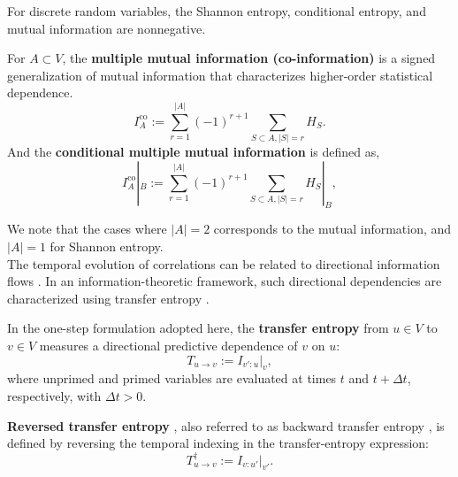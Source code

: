 \documentclass{comnet}%
\begin{document}
For discrete random variables, the Shannon entropy, conditional entropy, and mutual information are nonnegative.\\

\begin{definition}
	For $A \subset V$, the \textbf{multiple mutual information (co-information)} \cite{McGill1954, Fano1949, Han1980} is a signed generalization of mutual information that characterizes higher-order statistical dependence.
	\begin{equation}
		I^{\text{co}}_{A} := \sum_{r = 1}^{|A|} (-1)^{r+1} \sum_{S \subset A, |S|=r}H_{S}.
	\end{equation}
	And the \textbf{conditional multiple mutual information} is defined as,
	\begin{equation}
		I^{\text{co}}_{A}|_{B} := \sum_{r = 1}^{|A|} (-1)^{r+1} \sum_{S \subset A, |S|=r}H_{S}|_{B},
	\end{equation}
\end{definition}
We note that the cases where $|A| = 2$ corresponds to the mutual information, and $|A| = 1$ for Shannon entropy. \\

The temporal evolution of correlations can be related to directional information flows \cite{Lee2026a}. In an information-theoretic framework, such directional dependencies are characterized using transfer entropy \cite{Barnett2009}.

\begin{definition}
	In the one-step formulation adopted here, the \textbf{transfer entropy} \cite{Schreiber2000, Bossomaier2016} from $u \in V$ to $v \in V$ measures a directional predictive dependence of $v$ on $u$: \\
	\begin{equation}
		T_{u \to v} := I_{v':u}|_{v},
	\end{equation}
	where unprimed and primed variables are evaluated at times $t$ and $t + \Delta t$, respectively, with $\Delta t > 0$.\\
\end{definition}

\begin{definition}
	\textbf{Reversed transfer entropy} \cite{Ito2016, Spinney2016, Spinney2018b}, also referred to as backward transfer entropy \cite{Ito2016}, is defined by reversing the temporal indexing in the transfer-entropy expression:
	\begin{equation}
		T^{\dagger}_{u \to v} := I_{v:u'}|_{v'}.
	\end{equation}
\end{definition}
\end{document}
